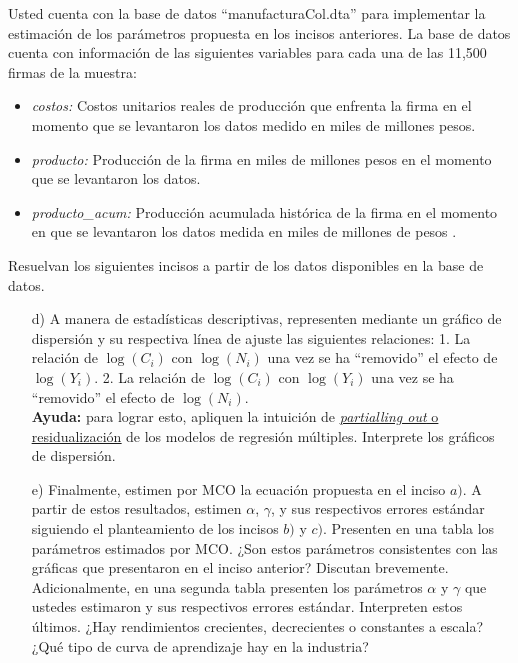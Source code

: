 \documentclass[a4paper]{article}
\begin{document}
Usted cuenta con la base de datos ``manufacturaCol.dta'' para implementar la estimación de los parámetros propuesta en los incisos anteriores. La base de datos cuenta con información de las siguientes variables para cada una de las 11,500 firmas de la muestra:

\begin{itemize}
    \item \textit{costos:} Costos unitarios reales de producción que enfrenta la firma en el momento que se levantaron los datos medido en miles de millones pesos.
    \item \textit{producto:} Producción de la firma en miles de millones pesos en el momento que se levantaron los datos.
    \item \textit{producto\_acum:} Producción acumulada histórica de la firma en el momento en que se levantaron los datos medida en miles de millones de pesos .
\end{itemize}

Resuelvan los siguientes incisos a partir de los datos disponibles en la base de datos.

\begin{itemize}
    
    \item[d)] A manera de estadísticas descriptivas, representen mediante un gráfico de dispersión y su respectiva línea de ajuste las siguientes relaciones: 1. La relación de $\log(C_{i})$ con $\log(N_{i})$ una vez se ha ``removido'' el efecto de $\log(Y_{i})$. 2. La relación de $\log(C_{i})$ con $\log(Y_{i})$ una vez se ha ``removido'' el efecto de $\log(N_{i})$.\\
    
    
    \textbf{Ayuda:} para lograr esto, apliquen la intuición de \href{https://www.dropbox.com/s/grsard9s9u8st0t/Partial\%20Regression.pdf?dl=0}{\underline{\textit{partialling out} o residualización}} de los modelos de regresión múltiples. Interprete los gráficos de dispersión.

    

    
    \item[e)] Finalmente, estimen por MCO la ecuación propuesta en el inciso $a)$. A partir de estos resultados, estimen $\alpha$, $\gamma$, y sus respectivos errores estándar siguiendo el planteamiento de los incisos $b)$ y $c)$. Presenten en una tabla los parámetros estimados por MCO. ¿Son estos parámetros consistentes con las gráficas que presentaron en el inciso anterior? Discutan brevemente. Adicionalmente, en una segunda tabla presenten los parámetros $\alpha$ y $\gamma$ que ustedes estimaron y sus respectivos errores estándar. Interpreten estos últimos. ¿Hay rendimientos crecientes, decrecientes o constantes a escala? ¿Qué tipo de curva de aprendizaje hay en la industria?
    
    
\end{itemize}
\end{document}
